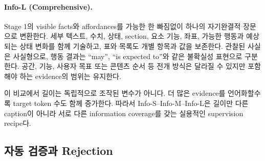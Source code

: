 \paragraph{Info-L (Comprehensive).}
Stage 1의 visible facts와 affordances를 가능한 한 빠짐없이 하나의
자기완결적 장문으로 변환한다. 세부 텍스트, 수치, 상태, section,
요소 기능, 좌표, 가능한 행동과 예상되는 상태 변화를 함께 기술하고,
표와 목록도 개별 항목과 값을 보존한다. 관찰된 사실은 사실형으로,
행동 결과는 ``may'', ``is expected to''와 같은 불확실성 표현으로
구분한다. 공간, 기능, 사용자 목표 또는 콘텐츠 순서 등 전개 방식은
달라질 수 있지만 포함해야 하는 evidence의 범위는 유지한다.

\begin{table}[t]
\centering
{}
\caption{세 webpage verbalization 조건의 목표 information budget.
길이 단위는 영문 단어 수이며, Info-L은 완전성을 우선하므로 고정된
길이 상한을 두지 않는다.}
\label{tab:appendix_info_levels}
\end{table}

이 비교에서 길이는 독립적으로 조작된 변수가 아니다. 더 많은
evidence를 언어화할수록 target token 수도 함께 증가한다. 따라서
Info-S--Info-M--Info-L은 길이만 다른 caption이 아니라 서로 다른
information coverage를 갖는 실용적인 supervision recipe다.

\subsection{자동 검증과 Rejection}

